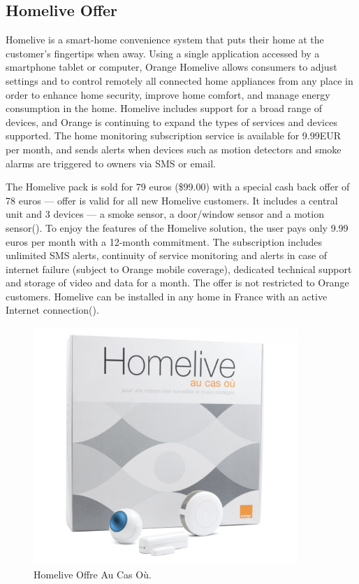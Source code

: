 \subsection{Homelive Offer}

Homelive is a smart-home convenience system that puts their home at the customer’s fingertips when away. Using a single application accessed by a smartphone tablet or computer, Orange Homelive allows consumers to adjust settings and to control remotely all connected home appliances from any place in order to enhance home security, improve home comfort, and manage energy consumption in the home. Homelive includes support for a broad range of devices, and Orange is continuing to expand the types of services and devices supported. The home monitoring subscription service is available for 9.99EUR per month, and sends alerts when devices such as motion detectors and smoke alarms are triggered to owners via SMS or email.

The Homelive pack is sold for 79 euros (\$99.00) with a special cash back offer of 78 euros — offer is valid for all new Homelive customers. It includes a central unit and 3 devices — a smoke sensor, a door/window sensor and a motion sensor(). To enjoy the features of the Homelive solution, the user pays only 9.99 euros per month with a 12-month commitment. The subscription includes unlimited SMS alerts, continuity of service monitoring and alerts in case of internet failure (subject to Orange mobile coverage), dedicated technical support and storage of video and data for a month. The offer is not restricted to Orange customers. Homelive can be installed in any home in France with an active Internet connection().

\begin{figure}[htbp]
	\centering
		\includegraphics[width=10cm]{Figures/Pack_Accesoires_Homelive.jpg}
	\caption[Homelive Offre Au Cas Où]{Homelive Offre Au Cas Où.}%
	\label{fig:1}
\end{figure}

